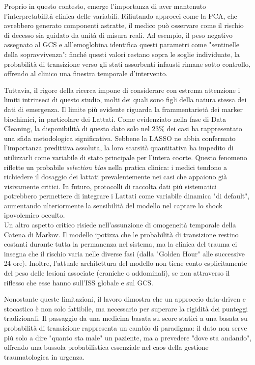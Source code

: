 \documentclass[11pt, oneside, noexaminfo]{sapthesis}   	%
\begin{document}
Proprio in questo contesto, emerge l'importanza di aver mantenuto l'interpretabilità clinica delle variabili. Rifiutando approcci come la PCA, che avrebbero generato componenti astratte, il medico può osservare come il rischio di decesso sia guidato da unità di misura reali. Ad esempio, il peso negativo assegnato al GCS e all'emoglobina identifica questi parametri come "sentinelle della sopravvivenza": finché questi valori restano sopra le soglie individuate, la probabilità di transizione verso gli stati assorbenti infausti rimane sotto controllo, offrendo al clinico una finestra temporale d'intervento.

Tuttavia, il rigore della ricerca impone di considerare con estrema attenzione i limiti intrinseci di questo studio, molti dei quali sono figli della natura stessa dei dati di emergenza. Il limite più evidente riguarda la frammentarietà dei marker biochimici, in particolare dei Lattati. Come evidenziato nella fase di Data Cleaning, la disponibilità di questo dato solo nel 23\% dei casi ha rappresentato una sfida metodologica significativa. Sebbene la LASSO ne abbia confermato l'importanza predittiva assoluta, la loro scarsità quantitativa ha impedito di utilizzarli come variabile di stato principale per l'intera coorte. Questo fenomeno riflette un probabile \textit{selection bias} nella pratica clinica: i medici tendono a richiedere il dosaggio dei lattati prevalentemente nei casi che appaiono già visivamente critici. In futuro, protocolli di raccolta dati più sistematici potrebbero permettere di integrare i Lattati come variabile dinamica "di default", aumentando ulteriormente la sensibilità del modello nel captare lo shock ipovolemico occulto.\\

Un altro aspetto critico risiede nell'assunzione di omogeneità temporale della Catena di Markov. Il modello ipotizza che le probabilità di transizione restino costanti durante tutta la permanenza nel sistema, ma la clinica del trauma ci insegna che il rischio varia nelle diverse fasi (dalla "Golden Hour" alle successive 24 ore). Inoltre, l'attuale architettura del modello non tiene conto esplicitamente del peso delle lesioni associate (craniche o addominali), se non attraverso il riflesso che esse hanno sull'ISS globale e sul GCS.

Nonostante queste limitazioni, il lavoro dimostra che un approccio data-driven e stocastico è non solo fattibile, ma necessario per superare la rigidità dei punteggi tradizionali. Il passaggio da una medicina basata su score statici a una basata su probabilità di transizione rappresenta un cambio di paradigma: il dato non serve più solo a dire "quanto sta male" un paziente, ma a prevedere "dove sta andando", offrendo una bussola probabilistica essenziale nel caos della gestione traumatologica in urgenza.
\end{document}
